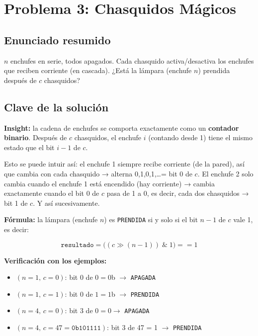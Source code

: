 \documentclass[12pt, oneside]{article}
\begin{document}
\newpage

\section{Problema 3: Chasquidos Mágicos}

\subsection{Enunciado resumido}

$n$ enchufes en serie, todos apagados.  Cada chasquido activa/desactiva los
enchufes que reciben corriente (en cascada).  ¿Está la lámpara (enchufe $n$)
prendida después de $c$ chasquidos?

\subsection{Clave de la solución}

\begin{notaprofesor}
  \textbf{Insight:} la cadena de enchufes se comporta exactamente como un
  \textbf{contador binario}.  Después de $c$ chasquidos, el enchufe $i$
  (contando desde 1) tiene el mismo estado que el bit $i-1$ de $c$.

  Esto se puede intuir así: el enchufe 1 siempre recibe corriente (de la pared),
  así que cambia con cada chasquido → alterna 0,1,0,1,\ldots = bit 0 de $c$.
  El enchufe 2 solo cambia cuando el enchufe 1 está encendido (hay corriente)
  → cambia exactamente cuando el bit 0 de $c$ pasa de 1 a 0, es decir, cada
  dos chasquidos → bit 1 de $c$.  Y así sucesivamente.

  \textbf{Fórmula:} la lámpara (enchufe $n$) es \texttt{PRENDIDA} si y solo
  si el bit $n-1$ de $c$ vale 1, es decir:

  \[
    \texttt{resultado} = \bigl((c \gg (n-1))\;\&\;1\bigr) == 1
  \]

  \textbf{Verificación con los ejemplos:}
  \begin{itemize}
    \item $(n=1,\,c=0)$: bit 0 de $0=0$b $\to$ \texttt{APAGADA} \checkmark
    \item $(n=1,\,c=1)$: bit 0 de $1=1$b $\to$ \texttt{PRENDIDA} \checkmark
    \item $(n=4,\,c=0)$: bit 3 de $0 = 0 \to$ \texttt{APAGADA} \checkmark
    \item $(n=4,\,c=47=\texttt{0b101111})$: bit 3 de 47 = 1 $\to$ \texttt{PRENDIDA} \checkmark
  \end{itemize}
\end{notaprofesor}
\end{document}
